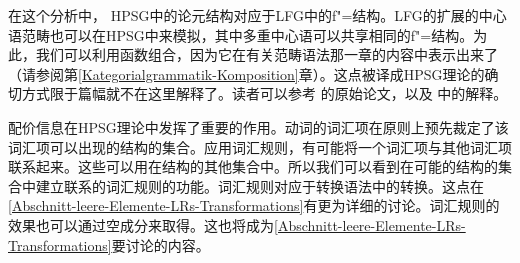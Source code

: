 在这个分析中， HPSG中的论元结构对应于LFG中的f"=结构。LFG\indexlfgc 的扩展的中心语范畴也可以在HPSG中来模拟，其中多重中心语可以共享相同的f"=结构。为此，我们可以利用函数组合，因为它在有关范畴语法\indexcgc 那一章的内容中表示出来了（请参阅第\ref{Kategorialgrammatik-Komposition}章）。这点被译成HPSG理论的确切方式限于篇幅就不在这里解释了。读者可以参考 \citet{HN94a}的原始论文，以及 中的解释。

配价信息在HPSG理论中发挥了重要的作用。动词的词汇项在原则上预先裁定了该词汇项可以出现的结构的集合。应用词汇规则，有可能将一个词汇项与其他词汇项联系起来。这些可以用在结构的其他集合中。所以我们可以看到在可能的结构的集合中建立联系的词汇规则的功能。词汇规则对应于转换语法中的转换。这点在\ref{Abschnitt-leere-Elemente-LRs-Transformations}有更为详细的讨论。词汇规则的效果也可以通过空成分来取得。这也将成为\ref{Abschnitt-leere-Elemente-LRs-Transformations}要讨论的内容。

